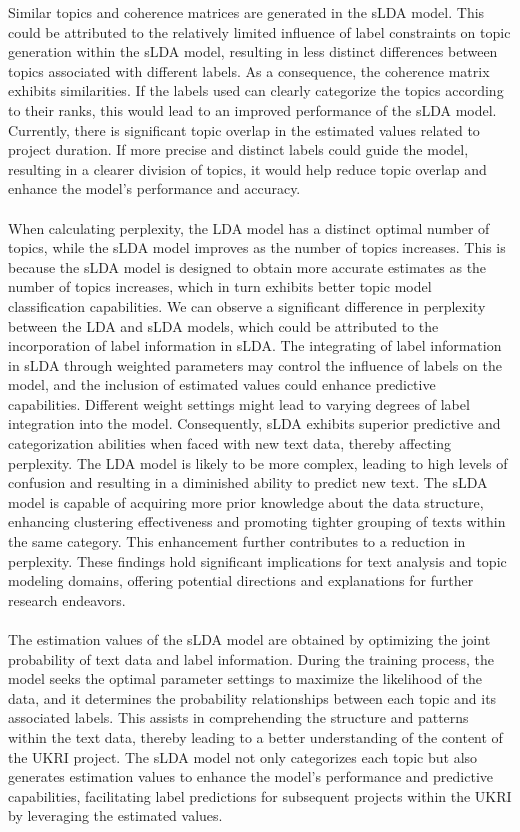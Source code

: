 \documentclass[12pt,twoside]{article}
\begin{document}
Similar topics and coherence matrices are generated in the sLDA model. This could be attributed to the relatively limited influence of label constraints on topic generation within the sLDA model, resulting in less distinct differences between topics associated with different labels. As a consequence, the coherence matrix exhibits similarities. If the labels used can clearly categorize the topics according to their ranks, this would lead to an improved performance of the sLDA model. Currently, there is significant topic overlap in the estimated values related to project duration. If more precise and distinct labels could guide the model, resulting in a clearer division of topics, it would help reduce topic overlap and enhance the model's performance and accuracy.\\\\

When calculating perplexity, the LDA model has a distinct optimal number of topics, while the sLDA model improves as the number of topics increases. This is because the sLDA model is designed to obtain more accurate estimates as the number of topics increases, which in turn exhibits better topic model classification capabilities. We can observe a significant difference in perplexity between the LDA and sLDA models, which could be attributed to the incorporation of label information in sLDA. The integrating of label information in sLDA through weighted parameters may control the influence of labels on the model, and the inclusion of estimated values could enhance predictive capabilities. Different weight settings might lead to varying degrees of label integration into the model. Consequently, sLDA exhibits superior predictive and categorization abilities when faced with new text data, thereby affecting perplexity. The LDA model is likely to be more complex, leading to high levels of confusion and resulting in a diminished ability to predict new text. The sLDA model is capable of acquiring more prior knowledge about the data structure, enhancing clustering effectiveness and promoting tighter grouping of texts within the same category. This enhancement further contributes to a reduction in perplexity. These findings hold significant implications for text analysis and topic modeling domains, offering potential directions and explanations for further research endeavors.\\\\

The estimation values of the sLDA model are obtained by optimizing the joint probability of text data and label information. During the training process, the model seeks the optimal parameter settings to maximize the likelihood of the data, and it determines the probability relationships between each topic and its associated labels. This assists in comprehending the structure and patterns within the text data, thereby leading to a better understanding of the content of the UKRI project. The sLDA model not only categorizes each topic but also generates estimation values to enhance the model's performance and predictive capabilities, facilitating label predictions for subsequent projects within the UKRI by leveraging the estimated values.\\\\
\end{document}

